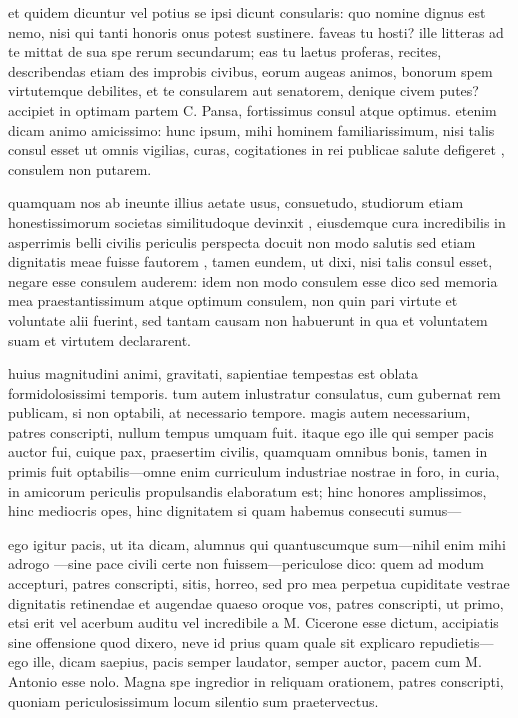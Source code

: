  et quidem dicuntur vel potius se ipsi dicunt consularis: quo nomine dignus est nemo, nisi qui tanti honoris onus potest sustinere. faveas tu hosti? ille litteras ad te mittat de sua spe rerum secundarum; eas tu laetus proferas, recites, describendas etiam des improbis civibus, eorum augeas animos, bonorum spem virtutemque debilites, et te consularem aut senatorem, denique civem putes? accipiet in optimam partem C. Pansa, fortissimus consul atque optimus. etenim dicam animo amicissimo: hunc ipsum, mihi hominem familiarissimum, nisi talis consul esset ut omnis vigilias, curas, cogitationes in rei publicae salute defigeret , consulem non putarem.

 quamquam nos ab ineunte illius aetate usus, consuetudo, studiorum etiam honestissimorum societas similitudoque devinxit , eiusdemque cura incredibilis in asperrimis belli civilis periculis perspecta docuit non modo salutis sed etiam dignitatis meae fuisse fautorem , tamen eundem, ut dixi, nisi talis consul esset, negare esse consulem auderem: idem non modo consulem esse dico sed memoria mea praestantissimum atque optimum consulem, non quin pari virtute et voluntate alii fuerint, sed tantam causam non habuerunt in qua et voluntatem suam et virtutem declararent.

 huius magnitudini animi, gravitati, sapientiae tempestas est oblata formidolosissimi temporis. tum autem inlustratur consulatus, cum gubernat rem publicam, si non optabili, at necessario tempore. magis autem necessarium, patres conscripti, nullum tempus umquam fuit. itaque ego ille qui semper pacis auctor fui, cuique pax, praesertim civilis, quamquam omnibus bonis, tamen in primis fuit optabilis—omne enim curriculum industriae nostrae in foro, in curia, in amicorum periculis propulsandis elaboratum est; hinc honores amplissimos, hinc mediocris opes, hinc dignitatem si quam habemus consecuti sumus—

 ego igitur pacis, ut ita dicam, alumnus qui quantuscumque sum—nihil enim mihi adrogo —sine pace civili certe non fuissem—periculose dico: quem ad modum accepturi, patres conscripti, sitis, horreo, sed pro mea perpetua cupiditate vestrae dignitatis retinendae et augendae quaeso oroque vos, patres conscripti, ut primo, etsi erit vel acerbum auditu vel incredibile a M. Cicerone esse dictum, accipiatis sine offensione quod dixero, neve id prius quam quale sit explicaro repudietis—ego ille, dicam saepius, pacis semper laudator, semper auctor, pacem cum M. Antonio esse nolo. Magna spe ingredior in reliquam orationem, patres conscripti, quoniam periculosissimum locum silentio sum praetervectus.

